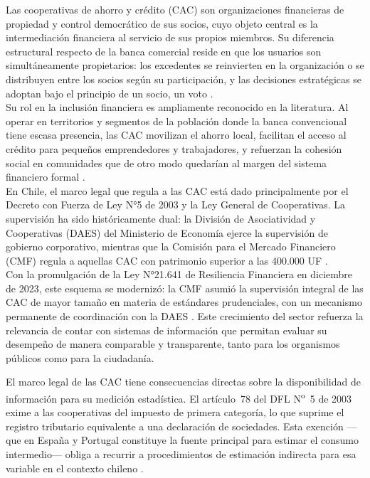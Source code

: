 Las cooperativas de ahorro y crédito (CAC) son organizaciones financieras 
de propiedad y control democrático de sus socios, cuyo objeto central es la 
intermediación financiera al servicio de sus propios miembros. Su diferencia 
estructural respecto de la banca comercial reside en que los usuarios son 
simultáneamente propietarios: los excedentes se reinvierten en la organización 
o se distribuyen entre los socios según su participación, y las decisiones 
estratégicas se adoptan bajo el principio de un socio, un voto 
.\\

Su rol en la inclusión financiera es ampliamente reconocido en la literatura. 
Al operar en territorios y segmentos de la población donde la banca convencional 
tiene escasa presencia, las CAC movilizan el ahorro local, facilitan el acceso 
al crédito para pequeños emprendedores y trabajadores, y refuerzan la cohesión 
social en comunidades que de otro modo quedarían al margen del sistema financiero 
formal .\\

En Chile, el marco legal que regula a las CAC está dado principalmente por el 
Decreto con Fuerza de Ley N°5 de 2003 y la Ley General de Cooperativas. La 
supervisión ha sido históricamente dual: la División de Asociatividad y 
Cooperativas (DAES) del Ministerio de Economía ejerce la supervisión de gobierno 
corporativo, mientras que la Comisión para el Mercado Financiero (CMF) regula a 
aquellas CAC con patrimonio superior a las 400.000 UF \cite{dfl5_cooperativas_2003}.\\ 
Con la promulgación de la Ley N°21.641 de Resiliencia Financiera en diciembre de 
2023, este esquema se modernizó: la CMF asumió la supervisión integral de las CAC 
de mayor tamaño en materia de estándares prudenciales, con un mecanismo permanente 
de coordinación con la DAES \cite{ley21641_resiliencia_2023}. Este crecimiento del 
sector refuerza la relevancia de contar con sistemas de información que permitan 
evaluar su desempeño de manera comparable y transparente, tanto para los organismos 
públicos como para la ciudadanía.

El marco legal de las CAC tiene consecuencias directas sobre la disponibilidad 
de información para su medición estadística. El artículo~78 del DFL 
N\textsuperscript{o}~5 de 2003 exime a las cooperativas del impuesto de 
primera categoría, lo que suprime el registro tributario equivalente a una 
declaración de sociedades. Esta exención ---que en España y Portugal constituye 
la fuente principal para estimar el consumo intermedio--- obliga a recurrir 
a procedimientos de estimación indirecta para esa variable en el contexto 
chileno .

